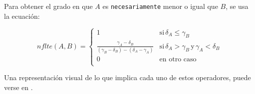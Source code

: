 \begin{definition}
Para obtener el grado en que $A$ es \texttt{necesariamente} menor o igual que $B$, se usa la ecuación:

\begin{equation}
    nflte(A,B) = \left\{ { \begin{array}{ll}
                    1 & \text{si}\, \delta_A \leq \gamma_B \\ 
                    \frac{\gamma_A - \delta_B}{(\gamma_B - \delta_B)-(\delta_A - \gamma_A)} & \text{si}\, \delta_A > \gamma_B \, \text{y} \, \gamma_A < \delta_B \\
                    0 & \text{en otro caso} \\ 
                    \end{array}  } \right.
\end{equation}
\end{definition}

Una representación visual de lo que implica cada uno de estos operadores, puede verse en \cite[p.~172]{tesispepe}.

